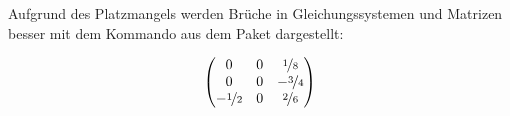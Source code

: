 Aufgrund des Platzmangels werden Brüche in Gleichungssystemen und Matrizen besser mit dem Kommando  aus dem  Paket dargestellt:

\begin{sidebyside}
	\[\begin{pmatrix}
	 0 & 0 & \nicefrac{1}{8} \\
	 0 & 0 & -\nicefrac{3}{4} \\
	 -\nicefrac{1}{2} & 0 & \nicefrac{2}{6} \\
	\end{pmatrix}\]
\end{sidebyside}


